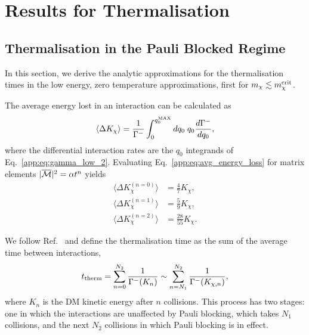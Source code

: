 \chapter{Results for Thermalisation}
\label{appendix:thermalisation_results}


\section{Thermalisation in the Pauli Blocked Regime}
\label{app:sec:pauliblockingle}
In this section, we derive the analytic approximations for the thermalisation times in the low energy, zero temperature approximations, first for $m_\chi\lesssim m_\chi^{\rm crit}$.

The average energy lost in an interaction can be calculated as
\begin{equation}
    \langle \Delta K_\chi \rangle = \frac{1}{\Gamma^-}\int_0^{q_0^{\rm MAX}} dq_0\; q_0 \frac{d \Gamma^-}{d q_0},
    \label{app:eq:avg_energy_loss}
\end{equation}
where the differential interaction rates are the $q_0$ integrands of Eq.~\ref{app:eq:gamma_low_2}. Evaluating Eq.~\ref{app:eq:avg_energy_loss} for matrix elements $|\overline{\mathcal M}|^2 = \alpha t^n$ yields
\begin{align}
    \langle \Delta K_\chi^{ (n = 0)} \rangle & = \frac{4}{7}K_\chi,\\
    \langle \Delta K_\chi^{ (n = 1)} \rangle & = \frac{5}{9}K_\chi,\\
    \langle \Delta K_\chi^{ (n = 2)} \rangle & = \frac{28}{55}K_\chi.
\end{align}

We follow Ref.~\cite{Bertoni:2013bsa_dec_DarkMatterThermalization} and define the thermalisation time as the sum of the average time between interactions, 
\begin{equation}
    t_{\rm therm} = \sum_{n=0}^{N_2} \frac{1}{\Gamma^-(K_{n})} \sim \sum_{n=N_1}^{N_2} \frac{1}{\Gamma^-(K_{\chi, n})},
    \label{app:eq:therm_time_defn}
\end{equation}
where $K_{n}$ is the DM kinetic energy after $n$ collisions. 
This process has two stages: one in which the interactions are unaffected by Pauli blocking, which takes $N_1$ collisions, and the next $N_2$ collisions in which Pauli blocking is in effect. 

